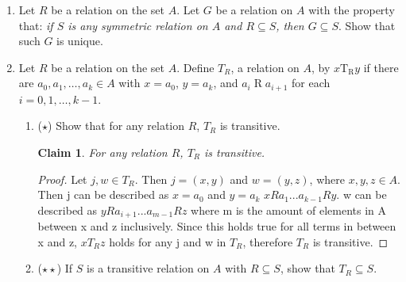 \documentclass[11pt]{letter}
\newtheorem{claim}{Claim}
\theoremstyle{definition}
\begin{document}
\begin{description}
\begin{enumerate}
		      \item Let $R$ be a relation on the set $A$. Let $G$ be a relation on $A$ with the property that: {\em if $S$ is any symmetric relation on $A$ and $R\subseteq S$, then $G\subseteq S$}. Show that such $G$ is unique.
			
		\item Let $R$ be a relation on the set $A$. Define $T_R$, a relation on $A$, by $x\operatorname{T_R}y$ if there are $a_0,a_1,\ldots, a_k\in A$ with $x=a_0$, $y=a_k$, and $a_i\operatorname{R}a_{i+1}$ for each $i=0,1,\ldots, k-1$.
				\begin{enumerate}
				\item ($\star$) Show that for any relation $R$, $T_R$ is transitive.
                                  \begin{claim}
                                    For any relation $R$, $T_R$ is transitive.
                                  \end{claim}
                                  \begin{proof}
                                   Let $j,w\in T_R$. Then $j=(x,y)$ and $w=(y,z)$, where $x,y,z\in A$. Then j can be described as $x=a_0$ and $y=a_k$ $xRa_1$...$a_{k-1}Ry$. w can be described as $yRa_{i+1}...a_{m-1}Rz$ where m is the amount of elements in A between x and z inclusively. Since this holds true for all terms in between x and z, $xT_Rz$ holds for any j and w in $T_R$, therefore $T_R$ is transitive.
                                  \end{proof}
                                  
					\item ($\star\star$) If $S$ is a transitive relation on $A$ with $R\subseteq S$, show that $T_R\subseteq S$.
				\end{enumerate}
		
			
	\end{enumerate}


\end{description}
\end{document}
